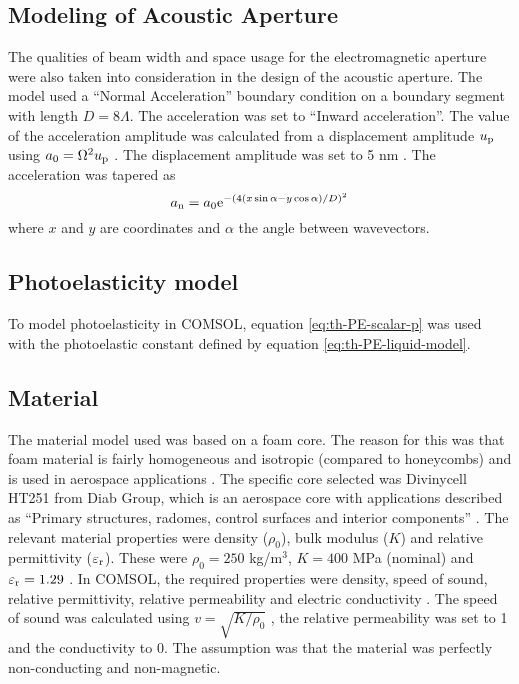 \documentclass[11pt,twoside]{eitExjobb}
\begin{document}
	\subsection{Modeling of Acoustic Aperture}
	The qualities of beam width and space usage for the electromagnetic aperture were also taken into consideration in the design of the acoustic aperture. The model used a ``Normal Acceleration'' boundary condition on a boundary segment with length $D = 8\Lambda$. The acceleration was set to ``Inward acceleration''. The value of the acceleration amplitude was calculated from a displacement amplitude $u_{\mathrm{p}}$ using $a_0 = \Omega^2 u_{\mathrm{p}}$ \addref. The displacement amplitude was set to 5 nm . The acceleration was tapered as
	\begin{equation*}
		a_{\mathrm{n}} = a_0 \mathrm{e}^{-(4(x\sin{\alpha} - y\cos{\alpha})/D)^2}
	\end{equation*}
	where $x$ and $y$ are coordinates and $\alpha$ the angle between wavevectors.
	
	\subsection{Photoelasticity model}
	To model photoelasticity in COMSOL, equation \eqref{eq:th-PE-scalar-p} was used with the photoelastic constant defined by equation \eqref{eq:th-PE-liquid-model}.
	
	\subsection{Material}
	The material model used was based on a foam core. The reason for this was that foam material is fairly homogeneous and isotropic (compared to honeycombs) and is used in aerospace applications \addref. The specific core selected was Divinycell HT251 from Diab Group, which is an aerospace core with applications described as ``Primary structures, radomes, control surfaces and interior components'' \cite{Diab2016}. The relevant material properties were density ($\rho_0$), bulk modulus ($K$) and relative permittivity ($\varepsilon_{\mathrm{r}}$). These were $\rho_0 = 250$ kg/m$^3$, $K = 400$ MPa (nominal) and $\varepsilon_{\mathrm{r}} = 1.29$ \cite{Diab2016}. In COMSOL, the required properties were density, speed of sound, relative permittivity, relative permeability and electric conductivity . The speed of sound was calculated using $v = \sqrt{K/\rho_0}$ , the relative permeability was set to 1 and the conductivity to 0. The assumption was that the material was perfectly non-conducting and non-magnetic.
	
\end{document}
